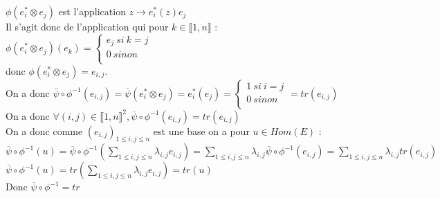 \documentclass{article}
\begin{document}
$\phi(e^\ast_i \otimes e_{j})$  est l'application $z \rightarrow e^*_i(z)e_j$ \\
Il s'agit donc de l'application qui pour $k\in \llbracket1,n\rrbracket$ : \\
$\phi(e^\ast_i \otimes e_{j})(e_k)=\begin{cases}
e_j \ si \ k=j \\
0 \ sinon \\
\end{cases}$ \\
donc $\phi(e^\ast_i \otimes e_{j})= e_{i,j}$. \\
On a donc $\overline{\psi} \circ \phi^{-1}(e_{i,j})= \overline{\psi}(e^\ast_i \otimes e_{j})=e^*_i(e_j)=\begin{cases}
1 \ si \ i=j \\
0 \ sinon \\
\end{cases}=tr(e_{i,j})$ \\
On a donc $\forall (i,j) \in \llbracket1,n\rrbracket^2,\overline{\psi} \circ \phi^{-1}(e_{i,j})=tr(e_{i,j})$ \\
On a donc comme $(e_{i,j})_{ 1 \leq i,j \leq n}$ est une base on a pour $u \in Hom(E)$ : \\
$\overline{\psi} \circ \phi^{-1}(u)=\overline{\psi} \circ \phi^{-1}(\sum_{ 1 \leq i,j\leq n} \lambda_{i,j} e_{i,j})=\sum_{ 1 \leq i,j\leq n} \lambda_{i,j}\overline{\psi} \circ \phi^{-1}(e_{i,j})=\sum_{ 1 \leq i,j\leq n}\lambda_{i,j} tr(e_{i,j})$ \\
$\overline{\psi} \circ \phi^{-1}(u)= tr(\sum_{ 1 \leq i,j\leq n}\lambda_{i,j} e_{i,j})=tr(u)$ \\
Donc $\overline{\psi} \circ \phi^{-1}=tr$
\end{document}
